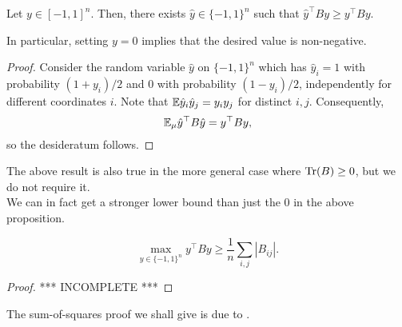 	\begin{fprop}
		\label{prop: solid-to-discrete-hypercube}
		Let $y \in [-1,1]^n$. Then, there exists $\hat{y} \in \{-1,1\}^n$ such that $\hat{y}^\top B y \ge y^\top B y$.
	\end{fprop}
	In particular, setting $y = 0$ implies that the desired value is non-negative.
	\begin{proof}
		Consider the random variable $\hat{y}$ on $\{-1,1\}^n$ which has $\hat{y}_i = 1$ with probability $(1+y_i)/2$ and $0$ with probability $(1-y_i)/2$, independently for different coordinates $i$. Note that $\mathbb{E} \hat{y}_i \hat{y}_j = y_i y_j$ for distinct $i, j$. Consequently,
		\[ \mathbb{E}_\mu \hat{y}^\top B \hat{y} = y^\top B y, \]
		so the desideratum follows.
	\end{proof}
	The above result is also true in the more general case where $\operatorname{Tr}(B) \ge 0$, but we do not require it.\\

	We can in fact get a stronger lower bound than just the $0$ in the above proposition.

	\begin{fprop}
		\[ \max_{y \in \{-1,1\}^n} y^\top B y \ge \frac{1}{n} \sum_{i,j} |B_{ij}|. \]
	\end{fprop}
	\begin{proof}
		*** INCOMPLETE ***
	\end{proof}

	The sum-of-squares proof we shall give is due to \cite{quad-optim-meg01,quad-optim-charikar-wirth}.


